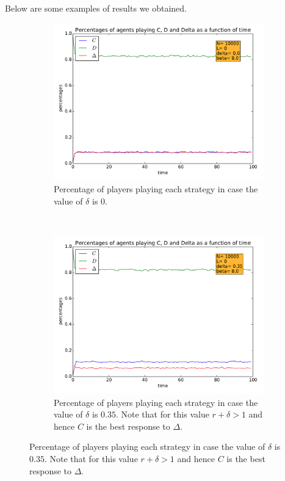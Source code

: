 \documentclass{article}
\begin{document}
Below are some examples of results we obtained.
\begin{figure}[htbp] 
\centering
\begin{subfigure}[t]{0.47\textwidth}
  \centering
  \includegraphics[width=\textwidth]{./Figures/BR_nodelta}
  \caption{Percentage of players playing each strategy in case the value of $\delta$ is 0.}
  \label{fig:BR_nodelta} 
\end{subfigure}%
~
~
\begin{subfigure}[t]{0.47\textwidth}
  \centering
  \includegraphics[width=\textwidth]{./Figures/BR_delta}
  \caption{Percentage of players playing each strategy in case the value of $\delta$ is $0.35$. Note that for this value $r+\delta >1$ and hence $C$ is the best response to $\Delta$.}

\end{subfigure}
\end{figure}
\end{document}
